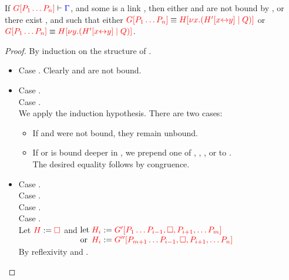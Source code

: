 \begin{lemmaB}\label{thm:cp-progress-link}
  If $\seq[{ \cpPlug{G}{P_1 \dots P_n} }]{ \Gamma }$, and some  is a
  link , then either  and  are not bound by
  , or there exist ,  and  such that either
  $\tm{\cpPlug{G}{P_1 \dots P_n}} \equiv
  \tm{\cpPlug{H}{\cpCut{x}{\cpPlug{H'}{\cpLink{x}{y}}}{Q}}}$ or 
  $\tm{\cpPlug{G}{P_1 \dots P_n}} \equiv
  \tm{\cpPlug{H}{\cpCut{y}{\cpPlug{H'}{\cpLink{x}{y}}}{Q}}}$. 
\end{lemmaB}
\begin{proof}
  By induction on the structure of .
  \begin{itemize}
  \item
    Case \tm{\Box}. Clearly  and  are not bound.
  \item
    Case .\\
    Case .\\
    We apply the induction hypothesis. There are two cases:
    \begin{itemize}
    \item
      If  and  were not bound, they remain unbound.
    \item
      If  or  is bound deeper in , we prepend one of
      ,
      ,
      , or
       to .
      \\
      The desired equality follows by congruence.
    \end{itemize}
  \item
    Case .\\
    Case .\\
    Case .\\
    Case .
    \\
    Let $\tm{H} := \tm{\Box}$ and 
    \(\arraycolsep=0pt\begin{array}[t]{ll}
      \text{let}
      & \; \tm{H_i} := \tm{\cpPlug{G'}{P_1 \dots P_{i-1}, \Box, P_{i+1}, \dots P_m}}
      \\
      \text{or}
      & \; \tm{H_i} := \tm{\cpPlug{G''}{P_{m+1} \dots P_{i-1}, \Box, P_{i+1}, \dots P_n}}
    \end{array}\)
    \\[1ex]
    By reflexivity and \cpEquivCutComm.
  \end{itemize}
\end{proof}
